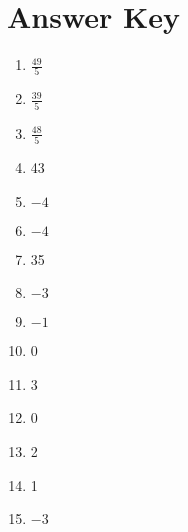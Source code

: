 \newpage

\section{Answer Key}

\begin{enumerate}
	\item $\frac{49}{5}$
    \item $\frac{39}{5}$
    \item $\frac{48}{5}$
    \item 43
    \item $-4$
    \item $-4$
    \item 35
    \item $-3$
    \item $-1$
    \item 0 
    \item 3
    \item 0
    \item 2
    \item 1
    \item $-3$
\end{enumerate}